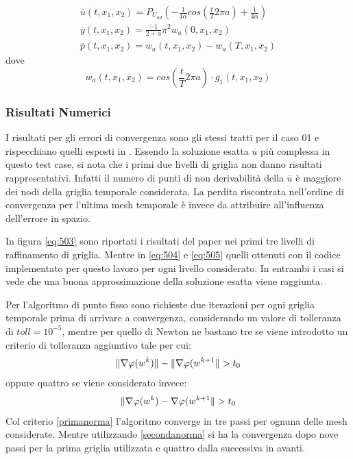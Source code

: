 {\renewcommand\arraystretch{2}
\begin{equation}
\begin{array}{c}
\overline{u}(t,x_1,x_2) = P_{U_{ad}} \left( -\frac{1}{4\alpha}cos \left( \frac{t}{T}2{\pi}a \right) +\frac{1}{4\alpha} \right) \\
\overline{y}(t,x_1,x_2) = \frac{- 1}{2 + a}{\pi}^2w_a(0,x_1,x_2) \\
\overline{p}(t,x_1,x_2) = w_a(t,x_1,x_2) - w_a(T,x_1,x_2)
\end{array}
\label{eq:507}
\end{equation}
}
dove
\begin{equation}
w_a(t,x_1,x_2) = cos \left( \frac{t}{T}2{\pi}a \right) \cdot g_1(t,x_1,x_2)
\label{eq:508}
\end{equation}

\subsubsection{Risultati Numerici}
I risultati per gli errori di convergenza sono gli stessi tratti per il caso 01 e rispecchiano quelli esposti in \cite{MAIN}. Essendo la soluzione esatta $\overline{u}$ più complessa in questo test case, si nota che i primi due livelli di griglia non danno risultati rappresentativi. Infatti il numero di punti di non derivabilità della $\overline{u}$ è maggiore dei nodi della griglia temporale considerata.
La perdita riscontrata nell'ordine di convergenza per l'ultima mesh temporale è invece da attribuire all'influenza dell'errore in spazio.
\par
In figura \ref{eq:503} sono riportati i risultati del paper \cite{MAIN} nei primi tre livelli di raffinamento di griglia. Mentre in \ref{eq:504} e \ref{eq:505} quelli ottenuti con il codice implementato per questo lavoro per ogni livello considerato. In entrambi i casi si vede che una buona approssimazione della soluzione esatta viene raggiunta.
\par
Per l'algoritmo di punto fisso sono richieste due iterazioni per ogni griglia temporale prima di arrivare a convergenza, considerando un valore di tolleranza di $toll=10^{-5}$, mentre per quello di Newton ne bastano tre se viene introdotto un criterio di tolleranza aggiuntivo tale per cui:
\begin{equation}
\lVert\nabla\varphi(w^k)\rVert - \lVert\nabla\varphi(w^{k+1}\rVert > t_0
\label{primanorma}
\end{equation} 
oppure quattro se viene considerato invece:
\begin{equation}
\lVert\nabla\varphi(w^k) - \nabla\varphi(w^{k+1}\rVert > t_0
\label{secondanorma}
\end{equation}
Col criterio \ref{primanorma} l'algoritmo converge in tre passi per ognuna delle mesh considerate. Mentre utilizzando \ref{secondanorma} si ha la convergenza dopo nove passi per la prima griglia utilizzata e quattro dalla successiva in avanti.

